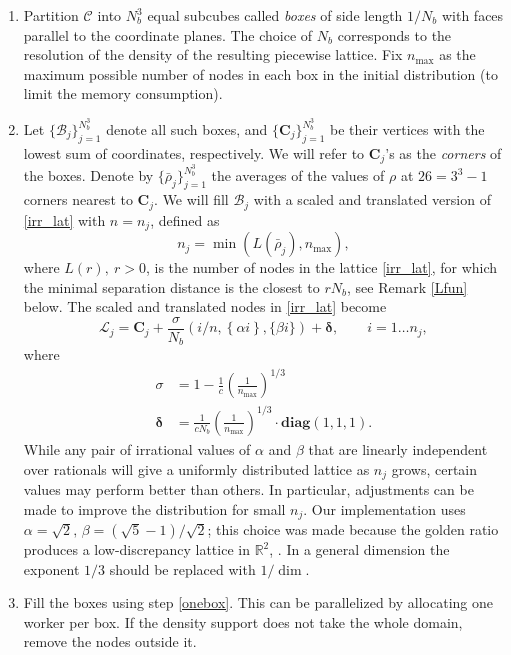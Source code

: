 \documentclass{amsart}
\newcommand{\ndbox}{\mathcal{B}}
\newcommand{\lat}{\mathcal{L}}
\newcommand{\bs}[1]{\boldsymbol{#1}}
\theoremstyle{definition}
\begin{document}
\begin{enumerate}
	
	\item \label{subcubes}  Partition $\mathcal{C}$ into $N_b^3$ equal subcubes called \textit{boxes} of side length $1/N_b$ with faces parallel to the coordinate planes. The choice of $N_b$ corresponds to the resolution of the density of the resulting piecewise lattice.  Fix $n_\text{max}$ as the maximum possible number of nodes in each box in the initial distribution (to limit the memory consumption). 
	
	\item \label{onebox}  Let  $\{\ndbox_j\}_{j=1}^{N_b^3}$ denote all such boxes, and $\{\boldsymbol{C}_j\}_{j=1}^{N_b^3}$ be their vertices with the lowest sum of coordinates, respectively. We will refer to $ \bs{C}_j $'s as the \textit{corners} of the boxes. Denote by $\{\bar{\rho}_j\}_{j=1}^{N_b^3}$ the averages of the values of $\rho$ at $ 26 = 3^3-1 $ corners  nearest to $ \bs{C}_j $. We will fill $ \mathcal{B}_j $ with a scaled and translated version of \eqref{irr_lat} with $ n=n_j $, defined as 
	\[  n_j = \min(L(\bar{\rho}_j),n_\text{max}), \]
	where $ L(r),\ r>0 $, is the number of nodes in the lattice \eqref{irr_lat}, for which the minimal separation distance is the closest to $ r N_b $, see Remark \ref{Lfun} below.
	The scaled and translated nodes in \eqref{irr_lat} become
	\[ \lat_j =  \boldsymbol{C}_j + \frac{\sigma}{N_b}  \left({i}/{n}, \left\{\alpha{i} \right\}, \{ \beta {i}  \}\right)  + \bs{\delta}, \qquad i=1\dots n_j, \]
	where 
	\[ \begin{aligned}
	 \sigma&={ 1 - \frac{1}{c}\left(\frac{1}{n_\text{max}}\right)^{1/3} }\\
	 \bs{\delta}&=\frac{1}{cN_b }\left(\frac{1}{n_\text{max}}\right)^{1/3}\cdot \textbf{diag}(1,1,1). 
	\end{aligned}\]
	 While any pair of irrational values of $\alpha$ and $\beta$ that are linearly independent over rationals will give a uniformly distributed lattice as $n_j$ grows, certain values  may perform better than others. In particular, adjustments can be made to improve the distribution for small $n_j$. Our implementation uses $\alpha = \sqrt2,\,	 \beta = (\sqrt5-1)/\sqrt2$; this choice was made because the golden ratio produces a low-discrepancy lattice in $ \mathbb{R}^2 $, \cite{Bilyk2013}. In a general dimension the exponent $ 1/3 $ should be replaced with $ 1/\dim $.
	
	\item \label{fill_boxes} Fill the boxes using step \eqref{onebox}. This can be parallelized by allocating one worker per box. If the density support does not take the whole domain, remove the nodes outside it.
	

\end{enumerate}
\end{document}
